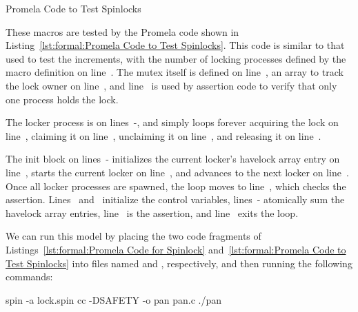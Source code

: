 \begin{listing}[tb]

\caption{Promela Code to Test Spinlocks}
\label{lst:formal:Promela Code to Test Spinlocks}
\end{listing}

\begin{lineref}
These macros are tested by the Promela code shown in
Listing~\ref{lst:formal:Promela Code to Test Spinlocks}.
This code is similar to that used to test the increments,
with the number of locking processes defined by the 
macro definition on line~.
The mutex itself is defined on line~,
an array to track the lock owner
on line~, and line~ is used by assertion
code to verify that only one process holds the lock.
\end{lineref}

\begin{lineref}
The locker process is on lines~-, and simply loops forever
acquiring the lock on line~, claiming it on line~,
unclaiming it on line~, and releasing it on line~.
\end{lineref}

\begin{lineref}
The init block on lines~- initializes the current locker's
havelock array entry on line~, starts the current locker on
line~, and advances to the next locker on line~.
Once all locker processes are spawned, the  loop
moves to line~, which checks the assertion.
Lines~ and~ initialize the control variables,
lines~- atomically sum the havelock array entries,
line~ is the assertion, and line~ exits the loop.
\end{lineref}

We can run this model by placing the two code fragments of
Listings~\ref{lst:formal:Promela Code for Spinlock}
and~\ref{lst:formal:Promela Code to Test Spinlocks} into
files named  and , respectively, and then running
the following commands:

\begin{VerbatimU}
spin -a lock.spin
cc -DSAFETY -o pan pan.c
./pan
\end{VerbatimU}

